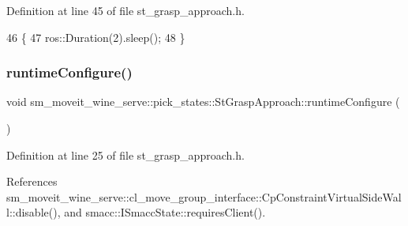 Definition at line 45 of file st\+\_\+grasp\+\_\+approach.\+h.


\begin{DoxyCode}
46             \{
47                 ros::Duration(2).sleep();
48             \}
\end{DoxyCode}
\mbox{\label{structsm__moveit__wine__serve_1_1pick__states_1_1StGraspApproach_a9d2a2d94d77142a50e9a348818c81217}} 
\subsubsection{\texorpdfstring{runtime\+Configure()}{runtimeConfigure()}}
{\footnotesize\ttfamily void sm\+\_\+moveit\+\_\+wine\+\_\+serve\+::pick\+\_\+states\+::\+St\+Grasp\+Approach\+::runtime\+Configure (\begin{DoxyParamCaption}{ }\end{DoxyParamCaption})\hspace{0.3cm}{\ttfamily [inline]}}



Definition at line 25 of file st\+\_\+grasp\+\_\+approach.\+h.



References sm\+\_\+moveit\+\_\+wine\+\_\+serve\+::cl\+\_\+move\+\_\+group\+\_\+interface\+::\+Cp\+Constraint\+Virtual\+Side\+Wall\+::disable(), and smacc\+::\+I\+Smacc\+State\+::requires\+Client().


